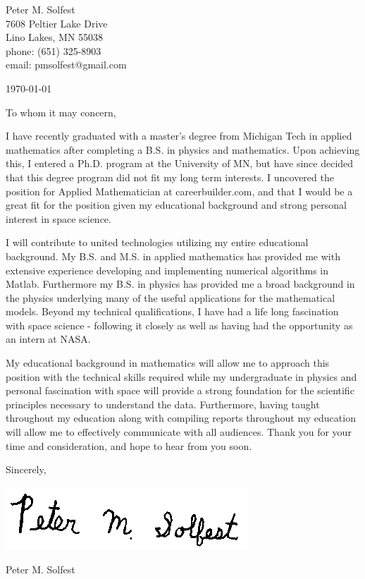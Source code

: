 \documentclass[letterpaper,12pt]{article}
\begin{document}
Peter M. Solfest\\
7608 Peltier Lake Drive\\
Lino Lakes, MN 55038\\
phone: (651) 325-8903\\
email: pmsolfest@gmail.com

\today


To whom it may concern, %

I have recently graduated with a master's degree from Michigan Tech in applied mathematics after
completing a B.S. in physics and mathematics.
Upon achieving this, I entered a Ph.D. program at the University of MN, but have since
decided that this degree program did not fit my long term interests.
I uncovered the position for Applied Mathematician at careerbuilder.com,
and that I would be a great fit for the position given my educational background
and strong personal interest in space science.

I will contribute to united technologies utilizing my entire educational background.
My B.S. and M.S. in applied mathematics has provided me with extensive experience developing
and implementing numerical algorithms in Matlab.
Furthermore my B.S. in physics has provided me a broad background in the physics
underlying many of the useful applications for the mathematical models.
Beyond my technical qualifications, I have had a life long fascination with
space science - following it closely as well as having had the opportunity
as an intern at NASA.

My educational background in mathematics will allow 
me to approach this position with the technical skills required
while my undergraduate in physics and personal fascination with space
will provide a strong foundation for the scientific principles necessary
to understand the data.
Furthermore, having taught throughout my education along with compiling reports
throughout my education will allow me to effectively communicate with all audiences.
Thank you for your time and consideration, and hope to hear from you soon.

Sincerely,

\includegraphics[height=.5in]{signature.png}

Peter M. Solfest
\end{document}
